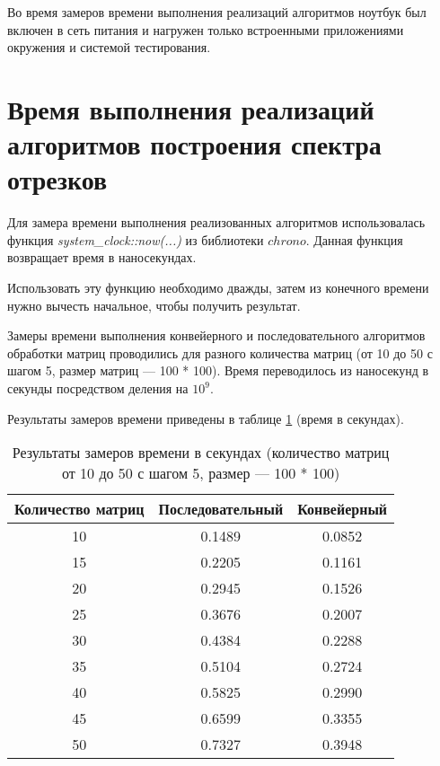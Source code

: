Во время замеров времени выполнения реализаций алгоритмов ноутбук был включен в сеть питания и нагружен только встроенными приложениями окружения и системой тестирования.

\section{Время выполнения реализаций алгоритмов построения спектра отрезков}
Для замера времени выполнения реализованных алгоритмов использовалась функция \textit{system\_clock::now(...)} из библиотеки $chrono$. Данная функция возвращает время в наносекундах.

Использовать эту функцию необходимо дважды, затем из конечного времени нужно вычесть начальное, чтобы получить результат.

Замеры времени выполнения конвейерного и последовательного алгоритмов обработки матриц проводились для разного количества матриц (от 10 до 50 с шагом 5, размер матриц --- 100 * 100). Время переводилось из наносекунд в секунды посредством деления на $10^9$.

Результаты замеров времени приведены в таблице \ref{tbl:time_mes_difnum} (время в секундах).
\clearpage
\begin{table}[h]
    \begin{center}
        \caption{Результаты замеров времени в секундах (количество матриц от 10 до 50 с шагом 5, размер --- 100 * 100)}
        \label{tbl:time_mes_difnum}
        \begin{tabular}{|c|c|c|}
            \hline
            Количество матриц & Последовательный & Конвейерный\\
            \hline
             10 & 0.1489 & 0.0852\\ \hline 
            15 & 0.2205 & 0.1161 \\ \hline 
            20 & 0.2945 & 0.1526\\ \hline 
            25 & 0.3676 & 0.2007\\ \hline 
            30 & 0.4384 & 0.2288\\ \hline 
            35 & 0.5104 & 0.2724\\ \hline 
            40 & 0.5825 & 0.2990\\ \hline 
            45 & 0.6599 & 0.3355\\ \hline 
            50 & 0.7327 & 0.3948\\ \hline  
		\end{tabular}
\end{center}
\end{table}

